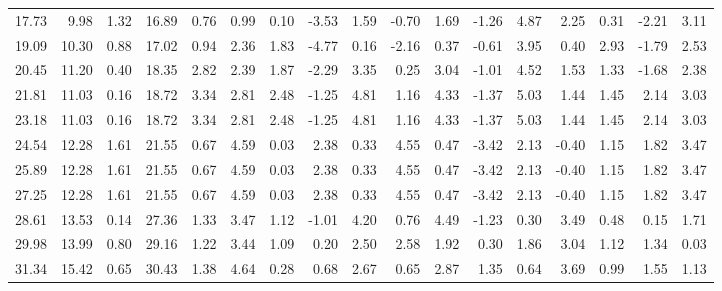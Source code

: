 \begin{tabular}{rrrrrrrrrrrrrrrrr}
   17.73 &     9.98 &     1.32 &    16.89  &     0.76 &      0.99 &      0.10 &     -3.53 &      1.59 &     -0.70 &      1.69 &     -1.26 &      4.87 &      2.25 &      0.31 &     -2.21 &      3.11 \\ 
   19.09 &    10.30 &     0.88 &    17.02  &     0.94 &      2.36 &      1.83 &     -4.77 &      0.16 &     -2.16 &      0.37 &     -0.61 &      3.95 &      0.40 &      2.93 &     -1.79 &      2.53 \\ 
   20.45 &    11.20 &     0.40 &    18.35  &     2.82 &      2.39 &      1.87 &     -2.29 &      3.35 &      0.25 &      3.04 &     -1.01 &      4.52 &      1.53 &      1.33 &     -1.68 &      2.38 \\ 
   21.81 &    11.03 &     0.16 &    18.72  &     3.34 &      2.81 &      2.48 &     -1.25 &      4.81 &      1.16 &      4.33 &     -1.37 &      5.03 &      1.44 &      1.45 &      2.14 &      3.03 \\ 
   23.18 &    11.03 &     0.16 &    18.72  &     3.34 &      2.81 &      2.48 &     -1.25 &      4.81 &      1.16 &      4.33 &     -1.37 &      5.03 &      1.44 &      1.45 &      2.14 &      3.03 \\ 
   24.54 &    12.28 &     1.61 &    21.55  &     0.67 &      4.59 &      0.03 &      2.38 &      0.33 &      4.55 &      0.47 &     -3.42 &      2.13 &     -0.40 &      1.15 &      1.82 &      3.47 \\ 
   25.89 &    12.28 &     1.61 &    21.55  &     0.67 &      4.59 &      0.03 &      2.38 &      0.33 &      4.55 &      0.47 &     -3.42 &      2.13 &     -0.40 &      1.15 &      1.82 &      3.47 \\ 
   27.25 &    12.28 &     1.61 &    21.55  &     0.67 &      4.59 &      0.03 &      2.38 &      0.33 &      4.55 &      0.47 &     -3.42 &      2.13 &     -0.40 &      1.15 &      1.82 &      3.47 \\ 
   28.61 &    13.53 &     0.14 &    27.36  &     1.33 &      3.47 &      1.12 &     -1.01 &      4.20 &      0.76 &      4.49 &     -1.23 &      0.30 &      3.49 &      0.48 &      0.15 &      1.71 \\ 
   29.98 &    13.99 &     0.80 &    29.16  &     1.22 &      3.44 &      1.09 &      0.20 &      2.50 &      2.58 &      1.92 &      0.30 &      1.86 &      3.04 &      1.12 &      1.34 &      0.03 \\ 
   31.34 &    15.42 &     0.65 &    30.43  &     1.38 &      4.64 &      0.28 &      0.68 &      2.67 &      0.65 &      2.87 &      1.35 &      0.64 &      3.69 &      0.99 &      1.55 &      1.13 \\ \hline 
\end{tabular}
